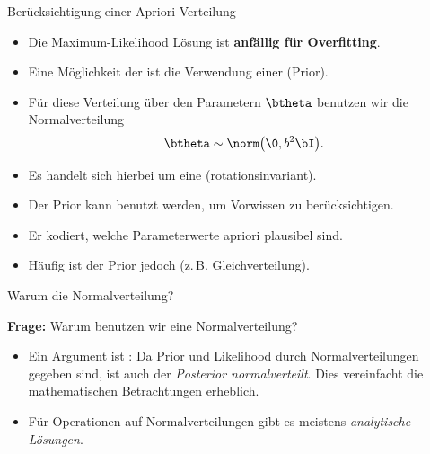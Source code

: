 \begin{frame}{Berücksichtigung einer Apriori-Verteilung}{}
	\begin{itemize}
		\item Die Maximum-Likelihood Lösung ist \textbf{anfällig für Overfitting}.
		\item Eine Möglichkeit der  ist die Verwendung einer  (Prior).
		\item Für diese Verteilung über den Parametern $\btheta$ benutzen wir die Normalverteilung
		\begin{equation}
			\btheta \sim \norm\bigl( \0, b^2 \bI \bigr).
		\end{equation}
		\item Es handelt sich hierbei um eine  (rotationsinvariant).
		\item Der Prior kann benutzt werden, um Vorwissen zu berücksichtigen.
		\item Er kodiert, welche Parameterwerte apriori plausibel sind.
		\item Häufig ist der Prior jedoch  (z.\,B. Gleichverteilung).
	\end{itemize}
\end{frame}


\begin{frame}{Warum die Normalverteilung?}{}
	\begin{boxGray}
		\textbf{Frage:} Warum benutzen wir eine Normalverteilung?
	\end{boxGray}
	
	\begin{itemize}
		\item Ein Argument ist : Da Prior und Likelihood durch Normalverteilungen gegeben sind,
			ist auch der \textit{Posterior normalverteilt}. Dies vereinfacht die mathematischen Betrachtungen erheblich.
		\item Für Operationen auf Normalverteilungen gibt es meistens \textit{analytische Lösungen}.
	\end{itemize}
\end{frame}


